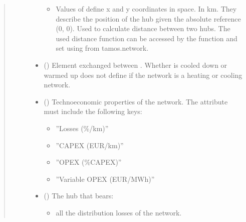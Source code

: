 \documentclass[letterpaper,10pt,english]{sphinxmanual}
\begin{document}
\begin{fulllineitems}
\begin{fulllineitems}
\begin{quote}
\begin{description}
\begin{itemize}
\begin{itemize}
\item {} 
\sphinxAtStartPar
Values of  define x and y coordinates in space.
In km.
They describe the position of the hub given the absolute reference (0, 0).
Used to calculate distance between two hubs. The used distance function can be accessed by the
 function and set using  from tamos.network.

\end{itemize}


\item {} 
\sphinxAtStartPar
{} () \textendash{} Element exchanged between .
Whether  is cooled down or warmed up does not define if the network is a heating or cooling network.

\item {} 
\sphinxAtStartPar
{} (\sphinxstyleliteralemphasis{\sphinxupquote{ | }}) \textendash{} 
\sphinxAtStartPar
Techno\sphinxhyphen{}economic properties of the network.
The  attribute must include the following keys:
\begin{itemize}
\item {} 
\sphinxAtStartPar
”Losses (\%/km)”

\item {} 
\sphinxAtStartPar
”CAPEX (EUR/km)”

\item {} 
\sphinxAtStartPar
”OPEX (\%CAPEX)”

\item {} 
\sphinxAtStartPar
”Variable OPEX (EUR/MWh)”

\end{itemize}


\item {} 
\sphinxAtStartPar
{} ({\hyperref[\detokenize{generated/tamos.Hub:tamos.Hub}]{}}) \textendash{} 
\sphinxAtStartPar
The hub that bears:
\begin{itemize}
\item {} 
\sphinxAtStartPar
all the distribution losses of the network.


\end{itemize}
\end{itemize}
\end{description}
\end{quote}
\end{fulllineitems}
\end{fulllineitems}
\end{document}
